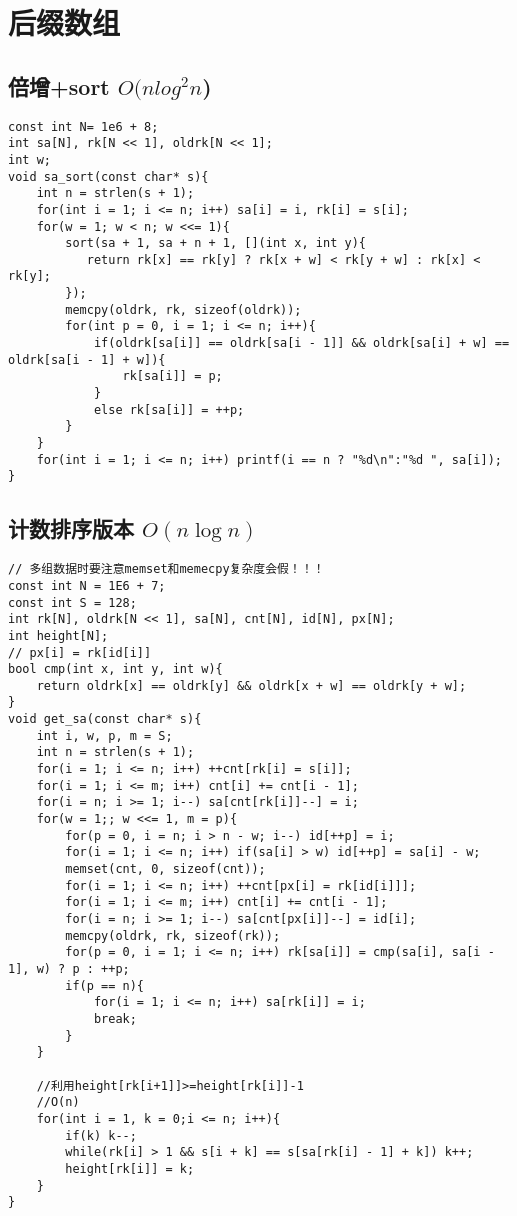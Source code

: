 \section{后缀数组}
\subsection{倍增+sort $O(n log^2n$)}
\begin{lstlisting}
const int N= 1e6 + 8;
int sa[N], rk[N << 1], oldrk[N << 1];
int w;
void sa_sort(const char* s){
    int n = strlen(s + 1);
    for(int i = 1; i <= n; i++) sa[i] = i, rk[i] = s[i];
    for(w = 1; w < n; w <<= 1){
        sort(sa + 1, sa + n + 1, [](int x, int y){
           return rk[x] == rk[y] ? rk[x + w] < rk[y + w] : rk[x] < rk[y];
        });
        memcpy(oldrk, rk, sizeof(oldrk));
        for(int p = 0, i = 1; i <= n; i++){
            if(oldrk[sa[i]] == oldrk[sa[i - 1]] && oldrk[sa[i] + w] == oldrk[sa[i - 1] + w]){
                rk[sa[i]] = p;
            }
            else rk[sa[i]] = ++p;
        }
    }
    for(int i = 1; i <= n; i++) printf(i == n ? "%d\n":"%d ", sa[i]);
}
\end{lstlisting}
\subsection{计数排序版本 $O(n\log n)$}
\begin{lstlisting}
// 多组数据时要注意memset和memecpy复杂度会假！！！
const int N = 1E6 + 7;
const int S = 128;
int rk[N], oldrk[N << 1], sa[N], cnt[N], id[N], px[N];
int height[N];
// px[i] = rk[id[i]]
bool cmp(int x, int y, int w){
    return oldrk[x] == oldrk[y] && oldrk[x + w] == oldrk[y + w];
}
void get_sa(const char* s){
    int i, w, p, m = S;
    int n = strlen(s + 1);
    for(i = 1; i <= n; i++) ++cnt[rk[i] = s[i]];
    for(i = 1; i <= m; i++) cnt[i] += cnt[i - 1];
    for(i = n; i >= 1; i--) sa[cnt[rk[i]]--] = i;
    for(w = 1;; w <<= 1, m = p){
        for(p = 0, i = n; i > n - w; i--) id[++p] = i;
        for(i = 1; i <= n; i++) if(sa[i] > w) id[++p] = sa[i] - w;
        memset(cnt, 0, sizeof(cnt));
        for(i = 1; i <= n; i++) ++cnt[px[i] = rk[id[i]]];
        for(i = 1; i <= m; i++) cnt[i] += cnt[i - 1];
        for(i = n; i >= 1; i--) sa[cnt[px[i]]--] = id[i];
        memcpy(oldrk, rk, sizeof(rk));
        for(p = 0, i = 1; i <= n; i++) rk[sa[i]] = cmp(sa[i], sa[i - 1], w) ? p : ++p;
        if(p == n){
            for(i = 1; i <= n; i++) sa[rk[i]] = i;
            break;
        }
    }
    
    //利用height[rk[i+1]]>=height[rk[i]]-1
	//O(n)
	for(int i = 1, k = 0;i <= n; i++){
		if(k) k--;
		while(rk[i] > 1 && s[i + k] == s[sa[rk[i] - 1] + k]) k++;
		height[rk[i]] = k;
	}
}
\end{lstlisting}
